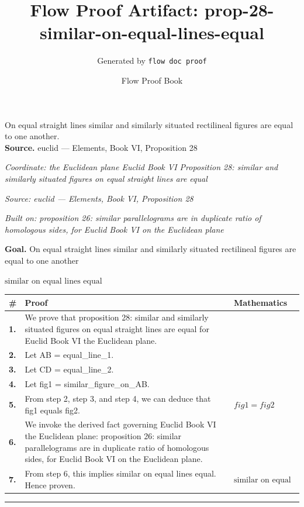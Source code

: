\documentclass[11pt]{article}
\title{Flow Proof Artifact: prop-28-similar-on-equal-lines-equal}
\author{Generated by \texttt{flow doc proof}}
\date{Flow Proof Book}
\theoremstyle{definition}
\begin{document}
\maketitle
On equal straight lines similar and similarly situated rectilineal figures are equal to one another.\\[0.5em]
\textbf{Source.} euclid — Elements, Book VI, Proposition 28\\[0.5em]
\bigskip
{}\par
\smallskip\noindent\textit{Coordinate: the Euclidean plane \cdot Euclid Book VI \cdot Proposition 28: similar and similarly situated figures on equal straight lines are equal}\par
\smallskip\noindent\textit{Source: euclid — Elements, Book VI, Proposition 28}\par
\smallskip\noindent\textit{Built on: proposition 26: similar parallelograms are in duplicate ratio of homologous sides, for Euclid Book VI on the Euclidean plane}\par
\medskip
\noindent\textbf{Goal.} On equal straight lines similar and similarly situated rectilineal figures are equal to one another\par
\noindent$\displaystyle \text{similar on equal lines equal}$\par
\medskip
\noindent
\begin{tabular}{@{} >{\raggedright\arraybackslash}p{} >{\raggedright\arraybackslash}p{} >{\raggedleft\arraybackslash}p{} @{}}
\textbf{\#} & \textbf{Proof} & \textbf{Mathematics} \\
\midrule
\textbf{1.} & We prove that proposition 28: similar and similarly situated figures on equal straight lines are equal for Euclid Book VI the Euclidean plane. & \\[0.45em]
\textbf{2.} & Let AB = equal\_line\_1. & \\[0.45em]
\textbf{3.} & Let CD = equal\_line\_2. & \\[0.45em]
\textbf{4.} & Let fig1 = similar\_figure\_on\_AB. & \\[0.45em]
\textbf{5.} & From step 2, step 3, and step 4, we can deduce that fig1 equals fig2. & $\displaystyle fig1 = fig2$ \\[0.45em]
\textbf{6.} & We invoke the derived fact governing Euclid Book VI the Euclidean plane: proposition 26: similar parallelograms are in duplicate ratio of homologous sides, for Euclid Book VI on the Euclidean plane. & \\[0.45em]
\textbf{7.} & From step 6, this implies similar on equal lines equal. Hence proven. & $\displaystyle \text{similar on equal lines equal}$ \\[0.45em]
\bottomrule
\end{tabular}
\label{thm:Geometry-Euclid Book VI-proposition_28_similar_and_similarly_situated_figures_on_equal_straight_lines_are_equal}
\par\medskip\hrule
\end{document}
